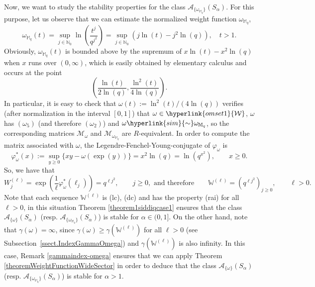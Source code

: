 \documentclass[11pt,a4paper]{article}
\theoremstyle{plain}
\theoremstyle{definition}
\newtheorem{remark}[proposition]{Remark}
\newcommand{\red}[1]{{\color{red}#1}}
\newcommand{\M}{\mathbb{M}}
\newcommand{\W}{\mathbb{W}}
\begin{document}
{Now, we want to study the stability properties for the class $\mathcal{A}_{\{\omega_{\M_q}\}}(S_{\alpha})$. For this purpose, let us observe that we can estimate the normalized weight function $ \omega_{\M_q}$,
$$\omega_{\M_q}(t)= \sup_{j\in\mathbb{N}_0} \ln\left(\frac{t^{j}}{q^{j^2}}\right)=\sup_{j\in\mathbb{N}_0} (j\ln(t)-j^2\ln(q)),\quad t>1.
$$
Obviously, $\omega_{\M_q}(t)$ is bounded above by the supremum of $x\ln(t)-x^2\ln(q)$ when $x$ runs over $(0,\infty)$, which is easily obtained by elementary calculus and occurs at the point
$$
\left(\frac{\ln(t)}{2\ln(q)},\frac{\ln^2(t)}{4\ln(q)}\right).
$$
In particular, it is easy to check that $\omega(t):=\ln^2(t)/(4\ln(q))$ verifies (after normalization in the interval $[0,1]$) that $\omega\in\hyperlink{omset1}{\mathcal{W}}$, $\omega$ has $(\omega_5)$ (and therefore $(\omega_2)$) and $\omega\hyperlink{sim}{\sim}\omega_{\M_q}$, so the corresponding matrices $\mathcal{M}_\omega$ and $\mathcal{M}_{\omega_{\M_q}}$ are $R$-equivalent. In order to compute the matrix associated with $\omega$, the Legendre-Fenchel-Young-conjugate of $\varphi_{\omega}$ is
$$
\varphi^{*}_{\omega}(x):=\sup_{y\ge 0}\{x y-\omega(\exp(y))\}=x^2\ln(q)=\ln(q^{x^2}),\qquad x\ge 0.
$$
So, we have that
$$
W^{(\ell)}_j=\exp(\frac{1}{\ell}\varphi^{*}_{\omega}(\ell_j))=q^{\ell j^2},\qquad j\geq0, \text{ and therefore}\qquad \W^{(\ell)}=(q^{\ell j^2})_{j\geq 0},\qquad \ell>0.
$$
Note that each sequence $\W^{(\ell)}$ is (lc), (dc) and has the property (rai) for all $\ell>0$, in this situation Theorem \ref{theorem1siddiqcase1} ensures that the class $\mathcal{A}_{\{\omega\}}(S_{\alpha})$ (resp. $\mathcal{A}_{\{\omega_{\M_q}\}}(S_{\alpha})$) is stable for $\alpha\in(0,1]$. On the other hand, note that $\gamma(\omega)=\infty$, since $\gamma(\omega)\geq \gamma(\W^{(\ell)})$ for all $\ell>0$ (see Subsection~\ref{ssect.IndexGammaOmega}) and $\gamma(\W^{(\ell)})$ is also infinity. In this case, Remark \ref{gammaindex-omega} ensures that we can apply Theorem \ref{theoremWeightFunctionWideSector} in order to deduce that the class $\mathcal{A}_{\{\omega\}}(S_{\alpha})$ (resp. $\mathcal{A}_{\{\omega_{\M_q}\}}(S_{\alpha})$) is stable for $\alpha>1$.

}

%
%
%
%
%
%
\end{document}
